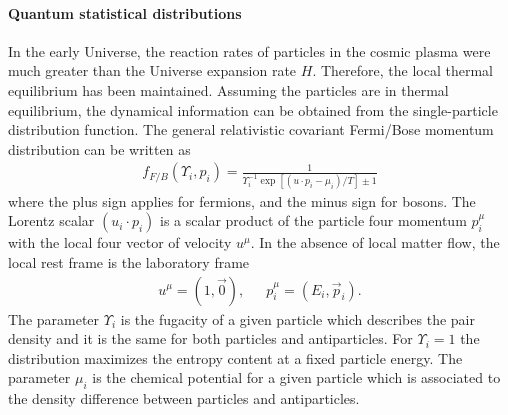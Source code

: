 \paragraph{Quantum statistical distributions}
In the early Universe, the reaction rates of particles in the cosmic plasma were much greater than the Universe expansion rate $H$. Therefore, the local thermal equilibrium has been maintained. Assuming the particles are in thermal equilibrium, the dynamical information can be obtained from the single-particle distribution function. The general relativistic covariant Fermi/Bose momentum distribution can be written as
\begin{align}
f_{F/B}(\Upsilon_i,p_i)=\frac{1}{\Upsilon^{-1}_i\exp{\left[(u\cdot p_i-\mu_i)/T\right]}\pm1}
\end{align}
where the plus sign applies for fermions, and the minus sign for bosons. The Lorentz scalar $(u_i\cdot p_i)$ is a scalar product of the particle four momentum $p^\mu_i$ with the local four vector of velocity $u^\mu$. In the absence of local matter flow, the local rest frame is the laboratory frame 
\begin{align}
u^\mu=\left(1,\vec{0}\right),\,\,\,\,\,\,\,\,\, p^\mu_i=\left(E_i,\vec{p}_i\right).
\end{align}  
The parameter $\Upsilon_i$ is the fugacity of a given particle which describes the pair density and it is the same for both particles and antiparticles. For $\Upsilon_i=1$ the distribution maximizes the entropy content at a fixed particle energy. The parameter $\mu_i$ is the chemical potential for a given particle which is associated to the density difference between particles and antiparticles. 

